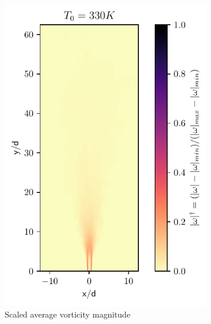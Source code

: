 \begin{figure}[htbp!]
\begin{subfigure}{0.25\textwidth}
	\includegraphics[scale=.65]{figures/Plots/vertical/330/magvort_scaled_vert_avg_330.pdf}
	\caption{Scaled average vorticity magnitude} \label{330_magvort_3}
\end{subfigure}
\hfill
\begin{subfigure}{0.25\textwidth}
	\centering

\end{subfigure}
\end{figure}
